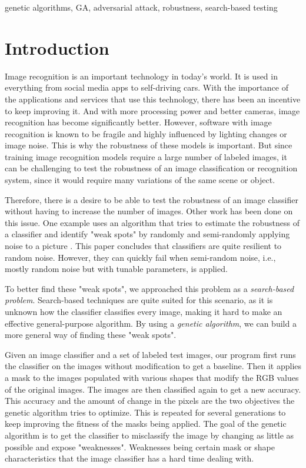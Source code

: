 \documentclass[conference]{IEEEtran}
\begin{document}
\begin{IEEEkeywords}
genetic algorithms, GA, adversarial attack, robustness, search-based testing
\end{IEEEkeywords}

\section{Introduction}
Image recognition is an important technology in today's world.
It is used in everything from social media apps to self-driving cars.
With the importance of the applications and services that use this technology, there has been an incentive to keep improving it.
And with more processing power and better cameras, image recognition has become significantly better.
However, software with image recognition is known to be fragile and highly influenced by lighting changes or image noise.
This is why the robustness of these models is important.
But since training image recognition models require a large number of labeled images, it can be challenging to test the robustness of an image classification or recognition system, since it would require many variations of the same scene or object.

Therefore, there is a desire to be able to test the robustness of an image classifier without having to increase the number of images.
Other work has been done on this issue. 
One example uses an algorithm that tries to estimate the robustness of a classifier and identify "weak spots" by randomly and semi-randomly applying noise to a picture \cite{Robust_image_thesis}.
This paper concludes that classifiers are quite resilient to random noise. 
However, they can quickly fail when semi-random noise, i.e., mostly random noise but with tunable parameters, is applied.

To better find these "weak spots", we approached this problem as a \textit{search-based problem}.
Search-based techniques are quite suited for this scenario, as it is unknown how the classifier classifies every image, making it hard to make an effective general-purpose algorithm.
By using a \textit{genetic algorithm}, we can build a more general way of finding these "weak spots".

Given an image classifier and a set of labeled test images, our program first runs the classifier on the images without modification to get a baseline. 
Then it applies a mask to the images populated with various shapes that modify the RGB values of the original images. 
The images are then classified again to get a new accuracy.
This accuracy and the amount of change in the pixels are the two objectives the genetic algorithm tries to optimize.
This is repeated for several generations to keep improving the fitness of the masks being applied.
The goal of the genetic algorithm is to get the classifier to misclassify the image by changing as little as possible and expose "weaknesses". Weaknesses being certain mask or shape characteristics that the image classifier has a hard time dealing with. 
\end{document}
